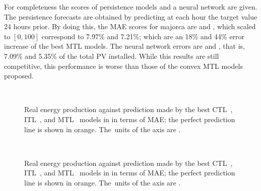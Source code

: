 %
For completeness the scores of persistence models and a neural network are given.
The persistence forecasts are obtained by predicting at each hour the target value 24 hours prior. By doing this, the MAE scores for majorca are  and , which scaled to $[0, 100]$ correspond to 7.97\% and 7.21\%; which are an 18\% and 44\% error increase of the best MTL models.
The neural network errors are  and , that is, 7.09\% and 5.35\% of the total PV installed. While this results are still competitive, this performance is worse than those of the convex MTL models proposed.


\begin{figure}[H]
    \centering%
    \quad%
    \quad%
    \\
 \caption{\label{fig:majorca_best_plots} Real energy production against prediction made by the best CTL~\protect{}, ITL~\protect{}, and MTL~\protect{} models {in}  in terms of MAE; the perfect prediction line is shown in orange. The~units of the axis are \mwhu{}.}
\end{figure}

\begin{figure}[H]
    \centering%
    \quad%
    \quad%
    \\
 \caption{\label{fig:tenerife_best_plots} Real energy production against prediction made by the best CTL~\protect{}, ITL~\protect{}, and MTL~\protect{} models {in}  in terms of MAE; the perfect prediction  line is shown in orange. The~units of the axis are \mwhu{}.}
\end{figure}


